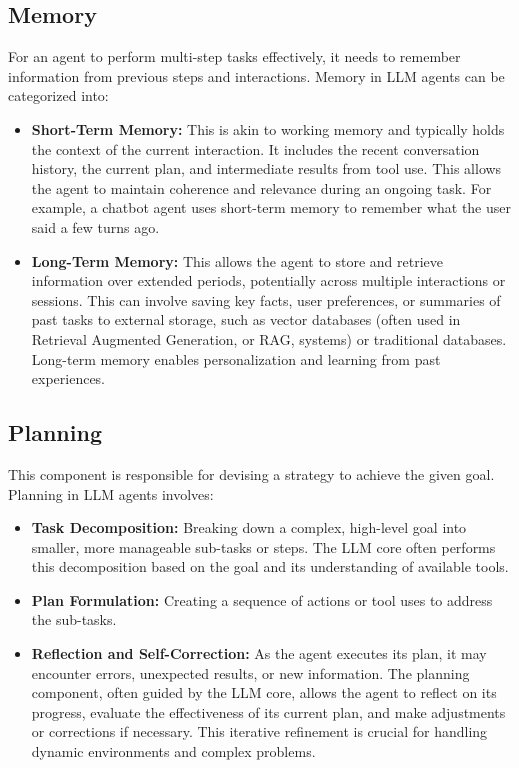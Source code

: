 \subsection*{Memory}
For an agent to perform multi-step tasks effectively, it needs to remember information from previous steps and interactions. Memory in 
LLM agents can be categorized into:

\begin{itemize}
    \item \textbf{Short-Term Memory:} This is akin to working memory and typically holds the context of the current interaction. 
    It includes the recent conversation history, the current plan, and intermediate results from tool use. This allows the agent to maintain 
    coherence and relevance during an ongoing task. For example, a chatbot agent uses short-term memory to remember what the user said a few turns ago.
    \item \textbf{Long-Term Memory:} This allows the agent to store and retrieve information over extended periods, potentially across 
    multiple interactions or sessions. This can involve saving key facts, user preferences, or summaries of past tasks to external storage, 
    such as vector databases (often used in Retrieval Augmented Generation, or RAG, systems) or traditional databases. Long-term memory enables 
    personalization and learning from past experiences.
\end{itemize}

\subsection*{Planning}
This component is responsible for devising a strategy to achieve the given goal. Planning in LLM agents involves:

\begin{itemize}
    \item \textbf{Task Decomposition:} Breaking down a complex, high-level goal into smaller, more manageable sub-tasks or steps. 
    The LLM core often performs this decomposition based on the goal and its understanding of available tools.
    \item \textbf{Plan Formulation:} Creating a sequence of actions or tool uses to address the sub-tasks.
    \item \textbf{Reflection and Self-Correction:} As the agent executes its plan, it may encounter errors, unexpected results, or new 
    information. The planning component, often guided by the LLM core, allows the agent to reflect on its progress, evaluate the effectiveness of 
    its current plan, and make adjustments or corrections if necessary. This iterative refinement is crucial for handling dynamic environments 
    and complex problems.
\end{itemize}

